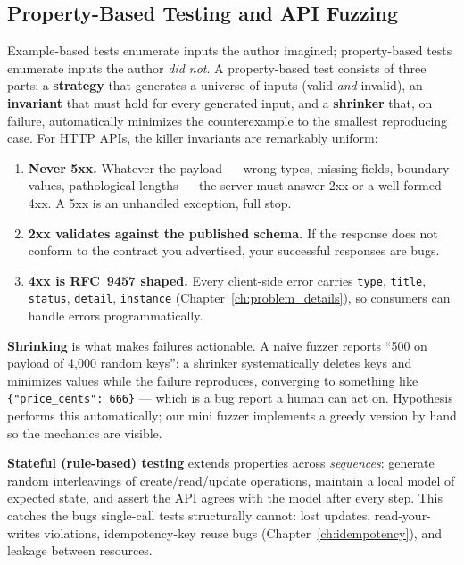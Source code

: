 \subsection{Property-Based Testing and API Fuzzing}
\label{sec:ch19-pbt}

Example-based tests enumerate inputs the author imagined; property-based
tests enumerate inputs the author \emph{did not}. A property-based test
consists of three parts: a \textbf{strategy} that generates a universe of
inputs (valid \emph{and} invalid), an \textbf{invariant} that must hold for
every generated input, and a \textbf{shrinker} that, on failure,
automatically minimizes the counterexample to the smallest reproducing
case. For HTTP APIs, the killer invariants are remarkably uniform:

\begin{enumerate}
  \item \textbf{Never 5xx.} Whatever the payload --- wrong types, missing
        fields, boundary values, pathological lengths --- the server must
        answer 2xx or a well-formed 4xx. A 5xx is an unhandled exception,
        full stop.
  \item \textbf{2xx validates against the published schema.} If the
        response does not conform to the contract you advertised, your
        successful responses are bugs.
  \item \textbf{4xx is RFC~9457 shaped.} Every client-side error carries
        \texttt{type}, \texttt{title}, \texttt{status}, \texttt{detail},
        \texttt{instance} (Chapter~\ref{ch:problem_details}), so consumers
        can handle errors programmatically.
\end{enumerate}

\textbf{Shrinking} is what makes failures actionable. A naive fuzzer
reports ``500 on payload of 4{,}000 random keys''; a shrinker
systematically deletes keys and minimizes values while the failure
reproduces, converging to something like
\texttt{\{"price\_cents": 666\}} --- which is a bug report a human can act
on. Hypothesis performs this automatically; our mini fuzzer implements a
greedy version by hand so the mechanics are visible.

\textbf{Stateful (rule-based) testing} extends properties across
\emph{sequences}: generate random interleavings of create/read/update
operations, maintain a local model of expected state, and assert the API
agrees with the model after every step. This catches the bugs single-call
tests structurally cannot: lost updates, read-your-writes violations,
idempotency-key reuse bugs (Chapter~\ref{ch:idempotency}), and leakage
between resources.


